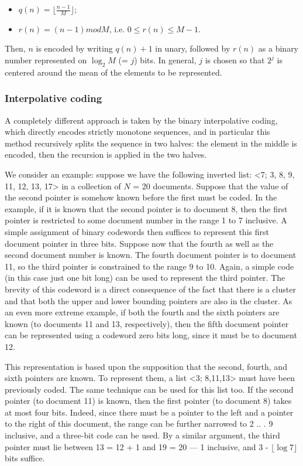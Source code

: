 \begin{itemize}
    \item $q(n) = \lfloor \frac{n-1}{M} \rfloor$;
    \item $r(n) = (n-1) mod M$, i.e. $0 \leq r(n) \leq M - 1$.
\end{itemize}

Then, $n$ is encoded by writing $q(n) + 1$ in unary, followed by $r(n)$ as a binary number represented on $\log_2 M$ (= $j$) bits. In general, $j$ is chosen so that $2^j$ is centered around the mean of the elements to be represented.

\subsubsection{Interpolative coding}
A completely different approach is taken by the binary interpolative coding, which directly encodes strictly monotone sequences, and in particular this method recursively splits the sequence in two halves: the element in the middle is encoded, then the recursion is applied in the two halves.

We consider an example: suppose we have the following inverted list: <7; 3, 8, 9, 11, 12, 13, 17> in a collection of $N$ = 20 documents. Suppose that the value of the second pointer is somehow known before the first must be coded. In the example, if it is known that the second pointer is to document 8, then the first pointer is restricted to some document number in the range 1 to 7 inclusive. A simple assignment of binary codewords then suffices to represent this first document pointer in three bits. Suppose now that the fourth as well as the second document number is known. The fourth document pointer is to document 11, so the third pointer is constrained to the range 9 to 10. Again, a simple code (in this case just one bit long) can be used to represent the third pointer. The brevity of this codeword is a direct consequence of the fact that there is a cluster and that both the upper and lower bounding pointers are also in the cluster. As an even more extreme example, if both the fourth and the sixth pointers are known (to documents 11 and 13, respectively), then the fifth document pointer can be represented using a codeword zero bits long, since it must be to document 12.

This representation is based upon the supposition that the second, fourth, and sixth pointers are known. To represent them, a list <3; 8,11,13> must have been previously coded. The same technique can be used for this list too. If the second pointer (to document 11) is known, then the first pointer (to document 8) takes at most four bits. Indeed, since there must be a pointer to the left and a pointer to the right of this document, the range can be further narrowed to 2 .. . 9 inclusive, and a three-bit code can be used. By a similar argument, the third pointer must lie between 13 = 12 + 1 and 19 = 20 — 1 inclusive, and 3 - $\lfloor \log 7 \rfloor$ bits suffice.

